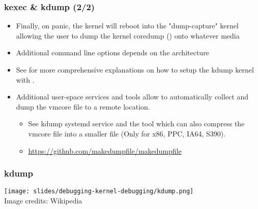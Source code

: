 \begin{frame}
  \frametitle{kexec \& kdump (2/2)}
  \begin{itemize}
    \item Finally, on panic, the kernel will reboot into the "dump-capture"
      kernel allowing the user to dump the kernel coredump ()
      onto whatever media
    \item Additional command line options depends on the architecture
    \item See  for more comprehensive
      explanations on how to setup the kdump kernel with .
    \item Additional user-space services and tools allow to automatically
      collect and dump the vmcore file to a remote location.
    \begin{itemize}
      \item See kdump systemd service and the  tool which
        can also compress the vmcore file into a smaller file (Only for x86,
        PPC, IA64, S390).
      \item \url{https://github.com/makedumpfile/makedumpfile}
    \end{itemize}
  \end{itemize}
\end{frame}

\begin{frame}
  \frametitle{kdump}
  \center\texttt{[image: slides/debugging-kernel-debugging/kdump.png]}\\
  \tiny Image credits: Wikipedia
\end{frame}

